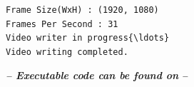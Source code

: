 \documentclass[a4paper,11pt]{article}%
\begin{document}
    \begin{Verbatim}[commandchars=\\\{\}]
Frame Size(WxH) : (1920, 1080)
Frames Per Second : 31
Video writer in progress{\ldots}
Video writing completed.
    \end{Verbatim}

\vfill
 \begin{center}
	\textit{ \textbf{-- Executable code can be found on}} \href{https://github.com/bimalka98/Computer-Vision-and-Image-Processing/blob/main/EN2550Assignments/A5/180631j_en2550_a05.ipynb}{\faGithub} \textbf{\textit{--}}
\end{center}
\end{document}
